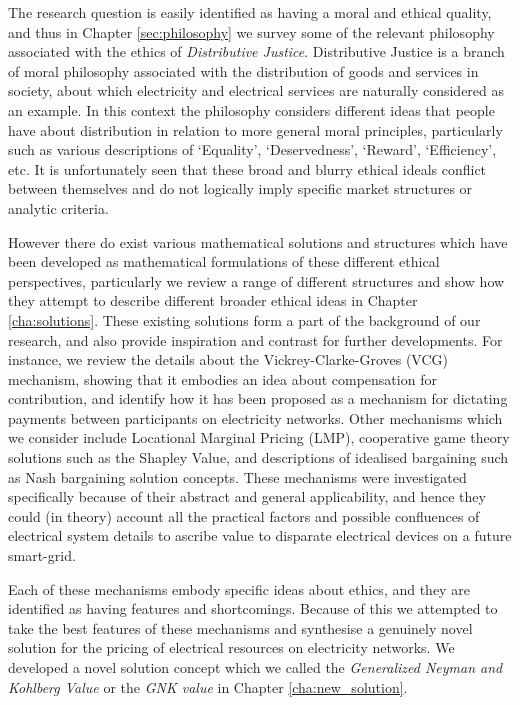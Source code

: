 The research question is easily identified as having a moral and ethical quality, and thus in Chapter \ref{sec:philosophy} we survey some of the relevant philosophy associated with the ethics of \textit{Distributive Justice}.
Distributive Justice is a branch of moral philosophy associated with the distribution of goods and services in society, about which electricity and electrical services are naturally considered as an example.
In this context the philosophy considers different ideas that people have about distribution in relation to more general moral principles, particularly such as various descriptions of `Equality', `Deservedness', `Reward', `Efficiency', etc.
It is unfortunately seen that these broad and blurry ethical ideals conflict between themselves and do not logically imply specific market structures or analytic criteria.


However there do exist various mathematical solutions and structures which have been developed as mathematical formulations of these different ethical perspectives, particularly we review a range of different structures and show how they attempt to describe different broader ethical ideas in Chapter \ref{cha:solutions}.
These existing solutions form a part of the background of our research, and also provide inspiration and contrast for further developments.
For instance, we review the details about the Vickrey-Clarke-Groves (VCG) mechanism, showing that it embodies an idea about compensation for contribution, and identify how it has been proposed as a mechanism for dictating payments between participants on electricity networks.
Other mechanisms which we consider include Locational Marginal Pricing (LMP), cooperative game theory solutions such as the Shapley Value, and descriptions of idealised bargaining such as Nash bargaining solution concepts.
These mechanisms were investigated specifically because of their abstract and general applicability, and hence they could (in theory) account all the practical factors and possible confluences of electrical system details to ascribe value to disparate electrical devices on a future smart-grid.


Each of these mechanisms embody specific ideas about ethics, and they are identified as having features and shortcomings. Because of this we attempted to take the best features of these mechanisms and synthesise a genuinely novel solution for the pricing of electrical resources on electricity networks.
We developed a novel solution concept which we called the \textit{Generalized Neyman and Kohlberg Value} or the \textit{GNK value} in Chapter \ref{cha:new_solution}.

